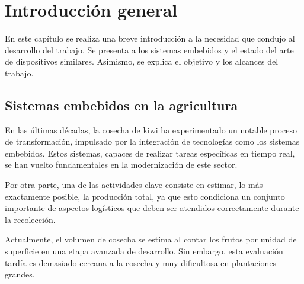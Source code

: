 
\chapter{Introducción general} %

En este capítulo se realiza una breve introducción a la necesidad que condujo al desarrollo del trabajo. Se presenta a los sistemas embebidos y el estado del arte de dispositivos similares. Asimismo, se explica el objetivo y los alcances del trabajo.

\label{Chapter1} %
\label{IntroGeneral}


\newcommand{\keyword}[1]{\textbf{#1}}
\newcommand{\tabhead}[1]{\textbf{#1}}
\newcommand{\code}[1]{\texttt{#1}}
\newcommand{\file}[1]{\texttt{\bfseries#1}}
\newcommand{\option}[1]{\texttt{\itshape#1}}
\newcommand{\grados}{$^{\circ}$}



\section{Sistemas embebidos en la agricultura}

En las últimas décadas, la cosecha de kiwi ha experimentado un notable proceso de transformación, impulsado por la integración de tecnologías como los sistemas embebidos. Estos sistemas, capaces de realizar tareas específicas en tiempo real, se han vuelto fundamentales en la modernización de este sector.

Por otra parte, una de las actividades clave consiste en estimar, lo más exactamente posible, la producción total, ya que esto condiciona un conjunto importante de aspectos logísticos que deben ser atendidos correctamente durante la recolección.

Actualmente, el volumen de cosecha se estima al contar los frutos por unidad de superficie en una etapa avanzada de desarrollo. Sin embargo, esta evaluación tardía es demasiado cercana a la cosecha y muy dificultosa en plantaciones grandes.

